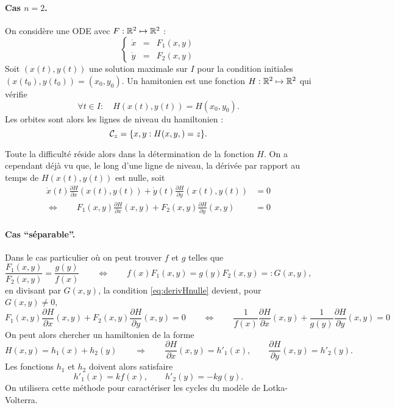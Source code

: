 \paragraph*{Cas $n = 2$.} 
On considère une ODE avec $F : \mathbb{R}^2 \mapsto \mathbb{R}^2$ : 
$$
\left\{\begin{array}{rcl} \dot x & = & F_1(x, y) \\ \dot y & = & F_2(x, y) \end{array}\right.
$$
Soit $(x(t), y(t))$ une solution maximale sur $I$ pour la condition initiales $(x(t_0), y(t_0)) = (x_0, y_0)$. Un hamitonien est une fonction $H : \mathbb{R}^2 \mapsto \mathbb{R}^2$ qui vérifie
$$
\forall t \in I: \quad H(x(t), y(t)) = H(x_0, y_0).
$$
Les orbites sont alors les lignes de niveau du hamiltonien : 
$$
\mathcal{C}_z = \{x, y: H(x, y, ) = z\}.
$$

Toute la difficulté réside alors dans la détermination de la fonction $H$. On a cependant déjà vu que, le long d'une ligne de niveau, la dérivée par rapport au temps de $H(x(t), y(t))$ est nulle, soit
\begin{align} \label{eq:derivHnulle}
  \dot x(t) \frac{\partial H}{\partial x} (x(t), y(t)) +
  \dot y(t) \frac{\partial H}{\partial y} (x(t), y(t)) & = 0 \nonumber \\
  \Leftrightarrow \qquad 
  F_1(x, y) \frac{\partial H}{\partial x} (x, y) +
  F_2(x, y) \frac{\partial H}{\partial y} (x, y) & = 0
\end{align}

\paragraph*{Cas ``séparable''.} 
Dans le cas particulier où on peut trouver $f$ et $g$ telles que
$$
\frac{F_1(x, y)}{F_2(x, y)} = \frac{g(y)}{f(x)}
\qquad \Leftrightarrow \qquad 
f(x) F_1(x, y) = g(y) F_2(x, y) =: G(x, y),
$$
en divisant par $G(x, y)$, la condition \eqref{eq:derivHnulle} devient, pour $G(x, y) \neq 0$,
$$
F_1(x, y) \frac{\partial H}{\partial x} (x, y) +
F_2(x, y) \frac{\partial H}{\partial y} (x, y) = 0
\qquad \Leftrightarrow \qquad 
\frac1{f(x)} \frac{\partial H}{\partial x} (x, y) +
\frac1{g(y)} \frac{\partial H}{\partial y} (x, y) = 0
$$
On peut alors chercher un hamiltonien de la forme
$$
H(x, y) = h_1(x) + h_2(y)
\qquad \Rightarrow \qquad 
\frac{\partial H}{\partial x} (x, y) = h'_1(x), \qquad
\frac{\partial H}{\partial y} (x, y) = h'_2(y).
$$
Les fonctions $h_1$ et $h_2$ doivent alors satisfaire
$$
h'_1(x) = k f(x), \qquad
h'_2(y) = - k g(y).
$$
On utilisera cette méthode pour caractériser les cycles du modèle de Lotka-Volterra.
